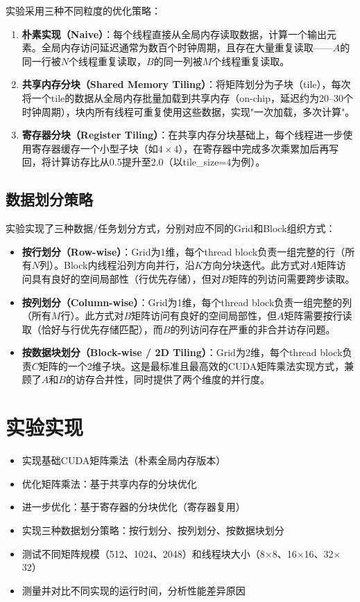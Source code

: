 \documentclass{SYSUReport}
\begin{document}
实验采用三种不同粒度的优化策略：
\begin{enumerate}
    \item \textbf{朴素实现（Naive）}：每个线程直接从全局内存读取数据，计算一个输出元素。全局内存访问延迟通常为数百个时钟周期，且存在大量重复读取——$A$的同一行被$N$个线程重复读取，$B$的同一列被$M$个线程重复读取。
    \item \textbf{共享内存分块（Shared Memory Tiling）}：将矩阵划分为子块（tile），每次将一个tile的数据从全局内存批量加载到共享内存（on-chip，延迟约为20--30个时钟周期），块内所有线程可重复使用这些数据，实现"一次加载，多次计算"。
    \item \textbf{寄存器分块（Register Tiling）}：在共享内存分块基础上，每个线程进一步使用寄存器缓存一个小型子块（如$4\times 4$），在寄存器中完成多次乘累加后再写回，将计算访存比从0.5提升至2.0（以tile\_size=4为例）。
\end{enumerate}

\subsection{数据划分策略}

实验实现了三种数据/任务划分方式，分别对应不同的Grid和Block组织方式：

\begin{itemize}
    \item \textbf{按行划分（Row-wise）}：Grid为1维，每个thread block负责一组完整的行（所有$N$列）。Block内线程沿列方向并行，沿$K$方向分块迭代。此方式对$A$矩阵访问具有良好的空间局部性（行优先存储），但对$B$矩阵的列访问需要跨步读取。
    \item \textbf{按列划分（Column-wise）}：Grid为1维，每个thread block负责一组完整的列（所有$M$行）。此方式对$B$矩阵访问有良好的空间局部性，但$A$矩阵需要按行读取（恰好与行优先存储匹配），而$B$的列访问存在严重的非合并访存问题。
    \item \textbf{按数据块划分（Block-wise / 2D Tiling）}：Grid为2维，每个thread block负责$C$矩阵的一个2维子块。这是最标准且最高效的CUDA矩阵乘法实现方式，兼顾了$A$和$B$的访存合并性，同时提供了两个维度的并行度。
\end{itemize}

\section{实验实现}

\begin{itemize}
    \item 实现基础CUDA矩阵乘法（朴素全局内存版本）
    \item 优化矩阵乘法：基于共享内存的分块优化
    \item 进一步优化：基于寄存器的分块优化（寄存器复用）
    \item 实现三种数据划分策略：按行划分、按列划分、按数据块划分
    \item 测试不同矩阵规模（512、1024、2048）和线程块大小（8$\times$8、16$\times$16、32$\times$32）
    \item 测量并对比不同实现的运行时间，分析性能差异原因
\end{itemize}
\end{document}
